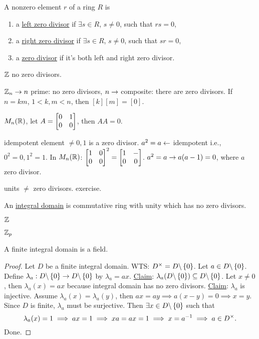 \documentclass[]{article}
\begin{document}
\begin{definition}
	A nonzero element $r$ of a ring $R$ is
	\begin{enumerate}
		\item a \ul{left zero divisor} if $\exists s\in R$, $s\neq 0$, such that $rs=0$,
		\item a \ul{right zero divisor} if $\exists s\in R$, $s\neq0$, such that $sr=0$,
		\item a \ul{zero divisor} if it's both left and right zero divisor.
	\end{enumerate}
\end{definition}
\begin{example}
	$\mathbb{Z}$ no zero divisors.
\end{example}
\begin{example}
	$\mathbb{Z}_n \rightarrow n$ prime: no zero divisors, $n \rightarrow$ composite: there are zero divisors. If $n=km$, $1<k,m<n$, then $[k][m]=[0]$.
\end{example}
\begin{example}
	$M_n(\mathbb{R})$, let $A = \begin{bmatrix}0&1\\0&0\end{bmatrix}$, then $AA=0$.
\end{example}
\begin{example}
	idempotent element $\neq 0,1$ is a zero divisor. $a^2=a \leftarrow$ idempotent i.e., $0^2=0,1^2=1$. In $M_n(\mathbb{R})$: $\begin{bmatrix}1&0\\0&0\end{bmatrix}^2 = \begin{bmatrix}1&-\\0&0\end{bmatrix}$. $a^2=a \rightarrow a(a-1)=0$, where $a$ zero divisor.
\end{example}
\begin{example}
	units $\neq$ zero divisors. exercise.
\end{example}
\begin{definition}
	An \ul{integral domain} is commutative ring with unity which has no zero divisors.
\end{definition}
\begin{example}
	$\mathbb{Z}$
\end{example}
\begin{example}
	$\mathbb{Z}_p$
\end{example}

\begin{theorem}
	A finite integral domain is a field.
\end{theorem}
\begin{proof}
	Let $D$ be a finite integral domain. WTS: $D^\times = D\backslash\left\{ 0 \right\}$.
	Let $a\in D\backslash\left\{ 0 \right\}$. Define $\lambda_a:D\backslash\left\{ 0 \right\}\rightarrow D\backslash\left\{ 0 \right\}$ by $\lambda_a = ax$.
	\ul{Claim}: $\lambda_a(D\backslash\left\{ 0 \right\}) \subseteq D\backslash\left\{ 0 \right\}$.
	Let $x\neq 0$, then $\lambda_a(x) = ax$ because integral domain has no zero divisors.
	\ul{Claim}: $\lambda_a$ is injective.
	Assume $\lambda_a(x) = \lambda_a(y)$, then $ax=ay \implies a(x-y)=0 \implies x=y$.
	Since $D$ is finite, $\lambda_a$ must be surjective.
	Then $\exists x\in D\backslash\left\{ 0 \right\}$ such that $$\lambda_a(x)=1 \implies ax=1 \implies xa = ax = 1 \implies x = a^{-1} \implies a\in D^\times.$$
	Done.
\end{proof}
\end{document}
